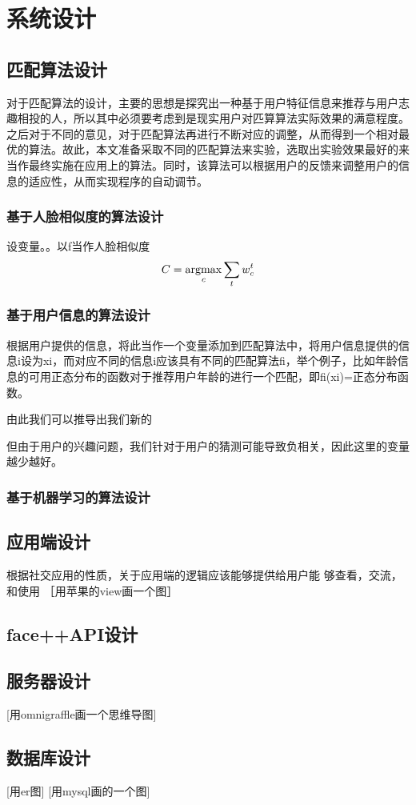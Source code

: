 
\chapter{系统设计}

\section{匹配算法设计}
对于匹配算法的设计，主要的思想是探究出一种基于用户特征信息来推荐与用户志趣相投的人，所以其中必须要考虑到是现实用户对匹算算法实际效果的满意程度。之后对于不同的意见，对于匹配算法再进行不断对应的调整，从而得到一个相对最优的算法。故此，本文准备采取不同的匹配算法来实验，选取出实验效果最好的来当作最终实施在应用上的算法。同时，该算法可以根据用户的反馈来调整用户的信息的适应性，从而实现程序的自动调节。
\subsection{基于人脸相似度的算法设计}
设变量。。以f当作人脸相似度
 \begin{equation}
   C = \mathop{\argmax}_{c}{\sum_t{w^t_c}}%
 \end{equation}

\subsection{基于用户信息的算法设计}
根据用户提供的信息，将此当作一个变量添加到匹配算法中，将用户信息提供的信息i设为xi，而对应不同的信息i应该具有不同的匹配算法fi，举个例子，比如年龄信息的可用正态分布的函数对于推荐用户年龄的进行一个匹配，即fi(xi)=正态分布函数。

由此我们可以推导出我们新的

但由于用户的兴趣问题，我们针对于用户的猜测可能导致负相关，因此这里的变量越少越好。
\subsection{基于机器学习的算法设计}

\section{应用端设计}

根据社交应用的性质，关于应用端的逻辑应该能够提供给用户能 够查看，交流，和使用
［用苹果的view画一个图］

\section{face++API设计}


\section{服务器设计}
[用omnigraffle画一个思维导图]


\section{数据库设计}

[用er图]
[用mysql画的一个图]



